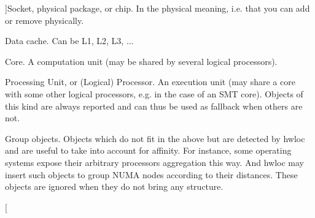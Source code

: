 \begin{Desc}
\begin{description}
{}]Socket, physical package, or chip. In the physical meaning, i.e. that you can add or remove physically. \item[{\em 
\hypertarget{a00041_ggacd37bb612667dc437d66bfb175a8dc55a56ee0b7eca88f363b75b34fdde8c9ddc}{
HWLOC\_\-OBJ\_\-CACHE}
\label{a00041_ggacd37bb612667dc437d66bfb175a8dc55a56ee0b7eca88f363b75b34fdde8c9ddc}
}]Data cache. Can be L1, L2, L3, ... \item[{\em 
\hypertarget{a00041_ggacd37bb612667dc437d66bfb175a8dc55ac793958f330bca371aa1535de8aff45f}{
HWLOC\_\-OBJ\_\-CORE}
\label{a00041_ggacd37bb612667dc437d66bfb175a8dc55ac793958f330bca371aa1535de8aff45f}
}]Core. A computation unit (may be shared by several logical processors). \item[{\em 
\hypertarget{a00041_ggacd37bb612667dc437d66bfb175a8dc55abca6887e80cb291353b0a0c1da83f661}{
HWLOC\_\-OBJ\_\-PU}
\label{a00041_ggacd37bb612667dc437d66bfb175a8dc55abca6887e80cb291353b0a0c1da83f661}
}]Processing Unit, or (Logical) Processor. An execution unit (may share a core with some other logical processors, e.g. in the case of an SMT core). Objects of this kind are always reported and can thus be used as fallback when others are not. \item[{\em 
\hypertarget{a00041_ggacd37bb612667dc437d66bfb175a8dc55a5269ef95be72f88465559d35c9b7ad56}{
HWLOC\_\-OBJ\_\-GROUP}
\label{a00041_ggacd37bb612667dc437d66bfb175a8dc55a5269ef95be72f88465559d35c9b7ad56}
}]Group objects. Objects which do not fit in the above but are detected by hwloc and are useful to take into account for affinity. For instance, some operating systems expose their arbitrary processors aggregation this way. And hwloc may insert such objects to group NUMA nodes according to their distances. These objects are ignored when they do not bring any structure. \item[{\em 
}
\end{description}
\end{Desc}
